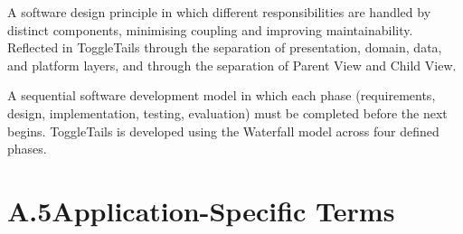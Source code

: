 \begin{description}[leftmargin=2.5cm, style=nextline]
\item[\textbf{Separation of Concerns}]
A software design principle in which different responsibilities are handled
by distinct components, minimising coupling and improving maintainability.
Reflected in ToggleTails through the separation of presentation, domain,
data, and platform layers, and through the separation of Parent View and
Child View.

\item[\textbf{Waterfall Methodology}]
A sequential software development model in which each phase (requirements,
design, implementation, testing, evaluation) must be completed before the
next begins. ToggleTails is developed using the Waterfall model across four
defined phases.

\end{description}

\section*{A.5\quad Application-Specific Terms}


